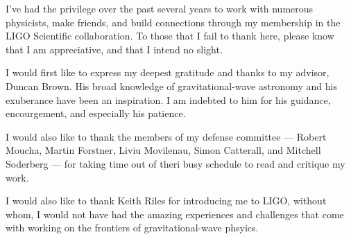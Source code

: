 I've had the privilege over the past several years to work with numerous physicists,
make friends, and build connections through my membership in the LIGO Scientific
collaboration. To those that I fail to thank here, please know that I am appreciative,
and that I intend no slight. 

\noindent I would first like to express my deepest gratitude and thanks to my advisor,
Duncan Brown. His broad knowledge of gravitational-wave astronomy and his
exuberance have been an inspiration. I am indebted to him for his
guidance, encourgement, and especially his patience.

\noindent I would also like to thank the members of my defense committee --- Robert Moucha,
Martin Forstner, Liviu Movilenau, Simon Catterall, and Mitchell Soderberg --- 
for taking time out of theri busy schedule to read and critique my work.

\noindent I would also like to thank Keith Riles for introducing me to LIGO,
without whom, I would not have had the amazing experiences and challenges that
come with working on the frontiers of gravitational-wave phsyics. 
